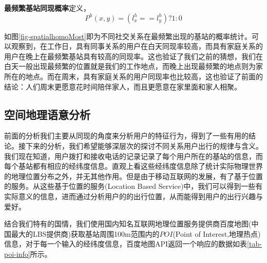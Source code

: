 \begin{definition}
    \label{spatial-homoMost-concept}
    \textbf{最频繁基站同现概率}定义，
    \begin{equation}
        P^{h}(x,y) = (l_x^h == l_y^h)? 1:0 
    \end{equation}
\end{definition}

如图\ref{fig-spatialhomoMost}即为不同社交关系在最频繁出现的基站的概率统计。可以观察到，在工作日，具有同事关系的用户在白天同现率较高，而具有家庭关系的用户在晚上在最频繁基站具有较高的同现率。这也验证了我们之前的猜想，我们在白天一般出现最频繁的位置就是我们的工作地点，而晚上出现最频繁的地点则为家所在的地点。而在周末，具有家庭关系的用户同现率也比较高，这也验证了前面的结论：人们周末更愿意花时间陪伴家人，而且更愿意在家里面和家人相聚。



\subsection{空间地理语意分析}

前面的分析我们主要从同现的角度来分析用户的特征行为，得到了一些有用的结论。接下来的分析，我们希望能够深层次的探讨不同关系用户出行的规律与含义。我们现在知道，用户拨打和接收电话的记录记录了每个用户所在的基站的信息，而每个基站都有相应的经纬度信息。直观上看这些经纬度信息除了统计实际物理世界的地理位置分布之外，并无其他作用。但是由于移动互联网的发展，有了基于位置的服务。从这些基于位置的服务(Location Based Service)中，我们可以得到一些有实际意义的信息，进而通过分析用户的的出行位置，从而能得到用户的出行兴趣与爱好。

结合我们特有的国情，我们使用国内知名互联网地理位置服务提供商百度地图(中国最大的LBS提供商)获取基站周围100m范围内的$POI$(Point of Interest,地理热点)信息，对于每一个输入的经纬度信息，百度地图API返回一个响应的数据如表\ref{tab-poi-info}所示。


